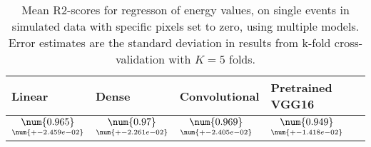 \begin{table}
\centering
\caption{
Mean R2-scores for regresson of energy values, on single events in simulated data with specific pixels
set to zero, using multiple models. 
Error estimates are the standard deviation in results from k-fold cross-validation 
with $K=5$ folds.
}
\label{tab:regression-simulated-single-energy-pixelmod-r2}
\begin{tabular}{llll}
\toprule
                                             Linear &                                              Dense &                                       Convolutional &                                    Pretrained VGG16 \\
\midrule
 $\underset{\num{+- 2.459e-02 }  }{\num{ 0.965 } }$ &  $\underset{\num{+- 2.261e-02 }  }{\num{ 0.97 } }$ &  $\underset{\num{+- 2.405e-02 }  }{\num{ 0.969 } }$ &  $\underset{\num{+- 1.418e-02 }  }{\num{ 0.949 } }$ \\
\bottomrule
\end{tabular}
\end{table}
